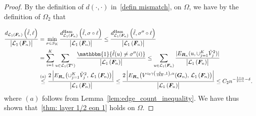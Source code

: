 \documentclass[twoside,11pt]{article}
\theoremstyle{remark}
\begin{document}
\begin{proof}
By the definition of $d(\cdot, \cdot)$ in~\eqref{defin mismatch}, on $\Omega$, we have by the definition of $\Omega_2$ that

%
\begingroup
\begin{equation*}
\begin{aligned}
\frac{d_{\mathcal{L}_1\left(\bm{F}_n\right)}\left(\hat{\ell},\ell\right)}{\left|\mathcal{L}_1\left(\boldsymbol{F}_n\right)\right|} &= \min_{\sigma \in S_K} \frac{d_{\mathcal{L}_1\left(\bm{F}_n\right)}^{\text{Ham}}\left(\hat{\ell},\sigma \circ \ell\right)}{\left|\mathcal{L}_1\left(\boldsymbol{F}_n\right)\right|} 
\leq \frac{d_{\mathcal{L}_1\left(\bm{F}_n\right)}^{\text{Ham}}\left(\hat{\ell},\sigma'' \circ \ell\right)}{\left|\mathcal{L}_1\left(\boldsymbol{F}_n\right)\right|} \\
&= \sum_{i=1}^K \sum_{u\in \mathcal{L}_1(\bm{T}^i)}
\frac{\mathbbm{1}\{\hat{\ell}(u)\neq \sigma''(i)\}}{\left|\mathcal{L}_1\left(\boldsymbol{F}_n\right)\right|} 
\le \sum_{u\in \mathcal{L}_1(\bm{F}_n)}\frac{|E_{\bm{R}_n}(u, \cup^K_{j=1} \tilde{V}^2_j)|}{\left|\mathcal{L}_1\left(\boldsymbol{F}_n\right)\right|}\\
%
&\stackrel{(a)}{\le} \frac{2\left|E_{\boldsymbol{R}_n}\bigl(\cup_{j=1}^K \tilde{V}^2_j, \,\mathcal{L}_1\left(\boldsymbol{F}_n\right)\bigr)\right|}{\left| \mathcal{L}_1\left(\boldsymbol{F}_n\right)\right|}
\le \frac{2\left|E_{\boldsymbol{R}_n}\bigl(V^{c_0\gamma\left(\frac{\varepsilon}{18 H}, 1\right), \alpha}(\boldsymbol{G}_n), \,\mathcal{L}_1\left(\boldsymbol{F}_n\right)\bigr)\right|}{\left| \mathcal{L}_1\left(\boldsymbol{F}_n\right)\right|}\le C_2 n^{-\frac{1+\alpha}{2+\alpha}-\delta}.
\end{aligned}
\end{equation*}
\endgroup
where $(a)$ follows from Lemma~\ref{lem:edge_count_inequality}. We have thus shown that~\eqref{thm: layer 1/2 eqn 1} holds on $\Omega$.



\end{proof}
\end{document}
